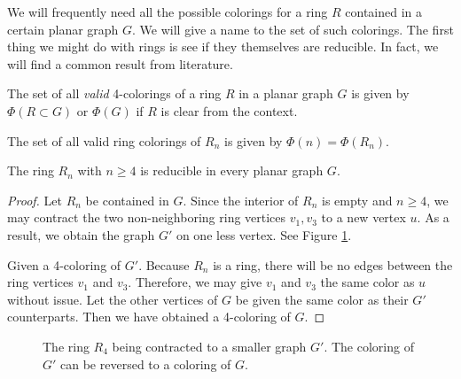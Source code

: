 We will frequently need all the possible colorings for a ring $R$ contained in a certain planar graph $G$. We will give a name to the set of such colorings. The first thing we might do with rings is see if they themselves are reducible. In fact, we will find a common result from literature.


\begin{definition}
    The set of all \emph{valid} 4-colorings of a ring $R$ in a planar graph $G$ is given by $\Phi(R \subset G)$ or $\Phi(G)$ if $R$ is clear from the context. 
\end{definition}
\begin{definition}
    The set of all valid ring colorings of $R_n$ is given by $\Phi(n) = \Phi(R_n)$.
\end{definition}

\begin{theorem}
    \label{thm:ringsarered}
    The ring $R_n$ with $n\geq 4$ is reducible in every planar graph $G$.
\end{theorem}

\begin{proof}
Let $R_n$ be contained in $G$. Since the interior of $R_n$ is empty and $n\geq4$, we may contract the two non-neighboring ring vertices $v_1, v_3$ to a new vertex $u$. As a result, we obtain the graph $G'$ on one less vertex. See Figure \ref{fig:ringcontract}.

Given a 4-coloring of $G'$. Because $R_n$ is a ring, there will be no edges between the ring vertices $v_1$ and $v_3$. Therefore, we may give $v_1$ and $v_3$ the same color as $u$ without issue. Let the other vertices of $G$ be given the same color as their $G'$ counterparts. Then we have obtained a 4-coloring of $G$.

\end{proof}

\needspace{4cm}
\begin{figure}[!h]
    \centering
    \caption{The ring $R_4$ being contracted to a smaller graph $G'$. The coloring of $G'$ can be reversed to a coloring of $G$.}
    \label{fig:ringcontract}
\end{figure}